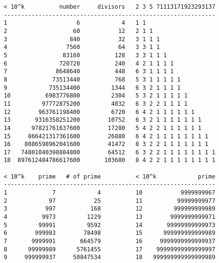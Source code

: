 \documentclass[8pt, a4paper, oneside, landscape]{extarticle}
\begin{document}
\begin{multicols*}{2}

\maketitlepage




\begin{verbatim}
    < 10^k          number     divisors   2 3 5 71113171923293137
    -------------------------------------------------------------
    1                    6            4   1 1
    2                   60           12   2 1 1
    3                  840           32   3 1 1 1
    4                 7560           64   3 3 1 1
    5                83160          128   3 3 1 1 1
    6               720720          240   4 2 1 1 1 1
    7              8648640          448   6 3 1 1 1 1
    8             73513440          768   5 3 1 1 1 1 1
    9            735134400         1344   6 3 2 1 1 1 1
    10          6983776800         2304   5 3 2 1 1 1 1 1
    11         97772875200         4032   6 3 2 2 1 1 1 1
    12        963761198400         6720   6 4 2 1 1 1 1 1 1
    13       9316358251200        10752   6 3 2 1 1 1 1 1 1 1
    14      97821761637600        17280   5 4 2 2 1 1 1 1 1 1
    15     866421317361600        26880   6 4 2 1 1 1 1 1 1 1 1
    16    8086598962041600        41472   8 3 2 2 1 1 1 1 1 1 1
    17   74801040398884800        64512   6 3 2 2 1 1 1 1 1 1 1 1
    18  897612484786617600       103680   8 4 2 2 1 1 1 1 1 1 1 1
    
    < 10^k    prime   # of prime          < 10^k            prime
    -------------------------------------------------------------
    1             7            4          10           9999999967
    2            97           25          11          99999999977
    3           997          168          12         999999999989
    4          9973         1229          13        9999999999971
    5         99991         9592          14       99999999999973
    6        999983        78498          15      999999999999989
    7       9999991       664579          16     9999999999999937
    8      99999989      5761455          17    99999999999999997
    9     999999937     50847534          18   999999999999999989
\end{verbatim}

\begin{itemize}[noitemsep]
    

\end{itemize}
\end{multicols*}
\end{document}
